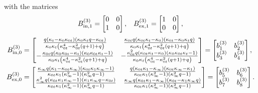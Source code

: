 \documentclass[a4paper,reqno,11pt]{amsart}
\numberwithin{equation}{section}
\numberwithin{figure}{section}
\theoremstyle{plain}
\theoremstyle{remark}
\numberwithin{rhp}{section}
\begin{document}
with the matrices
\begin{align}
   B^{(3)}_{\text{\text{in}},1} = \begin{bmatrix}
       0  & 0 \\
        1 & 0
    \end{bmatrix}, &&  B^{(3)}_{\text{ex},1} = \begin{bmatrix}
       1  & 0 \\
        0 & 0
    \end{bmatrix},
\end{align}
\begin{equation}\label{val:B1inout0}
\begin{split}
    B^{(3)}_{\text{\text{in}},0} &= \begin{bmatrix}
 \frac{q (\kappa_{t}-\kappa_{0} \kappa_{0t}) (\kappa_{0} \kappa_{t} q-\kappa_{0t})}{\kappa_{0} \kappa_{t} \left(\kappa_{0t}^4-\kappa_{0t}^2 (q+1)+q\right)} & \frac{\kappa_{0t} q (\kappa_{0t} \kappa_{t}-\kappa_{0}) (\kappa_{0t}-\kappa_{0} \kappa_{t} q)}{\kappa_{0} \kappa_{t} \left(\kappa_{0t}^4-\kappa_{0t}^2 (q+1)+q\right)} \\
 -\frac{\kappa_{0t} q (\kappa_{0} \kappa_{0t}-\kappa_{t}) (\kappa_{0} \kappa_{0t} \kappa_{t}-1)}{\kappa_{0} \kappa_{t} \left(\kappa_{0t}^4-\kappa_{0t}^2 (q+1)+q\right)} & -\frac{\kappa_{0t}^2 q (\kappa_{0t} \kappa_{t}-\kappa_{0}) (\kappa_{0} \kappa_{0t} \kappa_{t}-1)}{\kappa_{0} \kappa_{t} \left(\kappa_{0t}^4-\kappa_{0t}^2 (q+1)+q\right)} \\
\end{bmatrix}=\begin{bmatrix}
       b^{(3)}_1  & b_2^{(3)} \\
        b_3^{(3)} & b_4^{(3)} 
    \end{bmatrix},\\
B^{(3)}_{\text{ex},0}&= \begin{bmatrix}
 \frac{\kappa_{\infty} q (\kappa_{1}-\kappa_{0t} \kappa_{\infty}) (\kappa_{0t} \kappa_{1} \kappa_{\infty}-1)}{\kappa_{0t} \kappa_{1} \left(\kappa_{\infty}^2-1\right) \left(\kappa_{\infty}^2 q-1\right)} & \frac{q (\kappa_{0t} \kappa_{1}-\kappa_{\infty}) (\kappa_{0t} \kappa_{\infty}-\kappa_{1})}{\kappa_{0t} \kappa_{1} \left(\kappa_{\infty}^2-1\right) \left(\kappa_{\infty}^2 q-1\right)} \\
 \frac{\kappa_{\infty}^2 q (\kappa_{0t} \kappa_{1} \kappa_{\infty}-1) (\kappa_{1} \kappa_{\infty} q-\kappa_{0t})}{\kappa_{0t} \kappa_{1} \left(\kappa_{\infty}^2-1\right) \left(\kappa_{\infty}^2 q-1\right)} & \frac{\kappa_{\infty} q (\kappa_{0t} \kappa_{1}-\kappa_{\infty}) (\kappa_{0t}-\kappa_{1} \kappa_{\infty} q)}{\kappa_{0t} \kappa_{1} \left(\kappa_{\infty}^2-1\right) \left(\kappa_{\infty}^2 q-1\right)}\\
\end{bmatrix}=\begin{bmatrix}
       b_5^{(3)}  & b_6^{(3)} \\
        b_7^{(3)} & b_8^{(3)} 
    \end{bmatrix} .
\end{split}
\end{equation}
\end{document}
